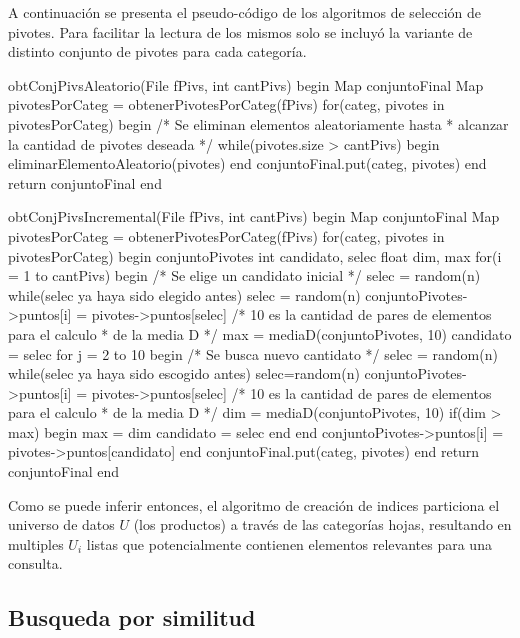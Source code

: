 A continuaci\'on se presenta el pseudo-c\'odigo de los algoritmos de selecci\'on de pivotes. Para facilitar la lectura de los mismos solo se incluy\'o la variante de distinto conjunto de pivotes para cada categor\'ia.

\begin{algorithm}[caption={Selecci\'on de pivotes aleatoria}, label={alg2}]
obtConjPivsAleatorio(File fPivs, int cantPivs)
begin
 Map conjuntoFinal
 Map pivotesPorCateg = obtenerPivotesPorCateg(fPivs)
 for(categ, pivotes in pivotesPorCateg)
 begin
  /* Se eliminan elementos aleatoriamente hasta 
   * alcanzar la cantidad de pivotes deseada */
  while(pivotes.size > cantPivs)
  begin
   eliminarElementoAleatorio(pivotes)
  end
  conjuntoFinal.put(categ, pivotes)
 end
 return conjuntoFinal
end
\end{algorithm}

\begin{algorithm}[caption={Selecci\'on de pivotes incremental}, label={alg3}]
obtConjPivsIncremental(File fPivs, int cantPivs)
begin
 Map conjuntoFinal
 Map pivotesPorCateg = obtenerPivotesPorCateg(fPivs)
 for(categ, pivotes in pivotesPorCateg)
 begin
  conjuntoPivotes
  int candidato, selec
  float dim, max
  for(i = 1 to cantPivs)
  begin
   /* Se elige un candidato inicial */ 
   selec = random(n)
   while(selec ya haya sido elegido antes)
    selec = random(n)
   conjuntoPivotes->puntos[i] = pivotes->puntos[selec]
   /* 10 es la cantidad de pares de elementos para el calculo
    * de la media D */
   max = mediaD(conjuntoPivotes, 10)
   candidato = selec
   for j = 2 to 10
    begin
    /* Se busca nuevo cantidato */
    selec = random(n)
    while(selec ya haya sido escogido antes)
     selec=random(n)
    conjuntoPivotes->puntos[i] = pivotes->puntos[selec]
    /* 10 es la cantidad de pares de elementos para el calculo 
     * de la media D */
    dim = mediaD(conjuntoPivotes, 10)
    if(dim > max)
    begin
     max = dim
     candidato = selec
    end
   end
   conjuntoPivotes->puntos[i] = pivotes->puntos[candidato]
  end
  conjuntoFinal.put(categ, pivotes)
 end
 return conjuntoFinal
end
\end{algorithm}

Como se puede inferir entonces, el algoritmo de creaci\'on de indices particiona el universo de datos $U$ (los productos) a trav\'es de las categor\'ias hojas, resultando en multiples $U_i$ listas que potencialmente contienen elementos relevantes para una consulta.\\

\subsection{Busqueda por similitud}

